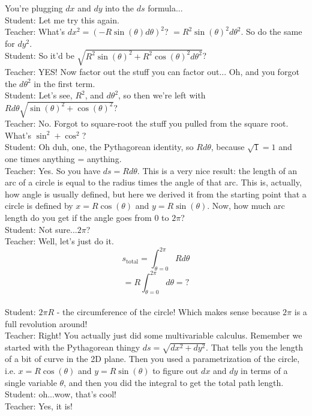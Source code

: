 You're plugging $dx$ and $dy$ into the $ds$ formula...\\
Student: Let me try this again.\\
Teacher: What's $dx^2 = (-R \sin(\theta) d\theta)^2$? $= R^2 \sin(\theta)^2 d\theta^2$.
So do the same for $dy^2$.\\
Student: So it'd be $\sqrt{R^2\sin(\theta)^2+R^2\cos(\theta)^2d\theta^2}$?\\
Teacher: YES!
Now factor out the stuff you can factor out...
Oh, and you forgot the $d\theta^2$ in the first term.\\
Student: Let's see, $R^2$, and $d\theta^2$,
so then we're left with $Rd\theta\sqrt{\sin(\theta)^2+\cos(\theta)^2}$?\\
Teacher: No. Forgot to square-root the stuff you pulled from the square root.
What's $\sin^2 + \cos^2$?\\
Student: Oh duh, one, the Pythagorean identity,
so $Rd\theta$,
because $\sqrt{1} = 1$
and one times anything = anything.\\
Teacher: Yes.
So you have $ds = R d\theta$.
This is a very nice result: the length of an arc of a circle is equal to the radius times the angle of that arc.
This is, actually, how angle is usually defined, but here we derived it from the starting point that a circle is defined by $x = R \cos(\theta)$ and $y = R \sin(\theta)$.
Now, how much arc length do you get if the angle goes from 0 to $2\pi$?\\
Student: Not sure...$2\pi$?\\
Teacher: Well, let's just do it. $$s_\text{total} = \int_{\theta=0}^{2\pi} R d\theta$$
$$=R \int_{\theta=0}^{2\pi} d \theta = ?$$\\
Student: $2\pi R$ - 
the circumference of the circle!
Which makes sense because $2\pi$ is a full revolution around!\\
Teacher: Right! You actually just did some multivariable calculus.
Remember we started with the Pythagorean thingy $ds = \sqrt{dx^2 + dy^2}$.
That tells you the length of a bit of curve in the 2D plane.
Then you used a parametrization of the circle, i.e. $x = R \cos(\theta)$ and $y = R \sin(\theta)$ to figure out $dx$ and $dy$ in terms of a single variable $\theta$, and then you did the integral to get the total path length.\\
Student: oh...wow, that's cool!\\
Teacher: Yes, it is!
